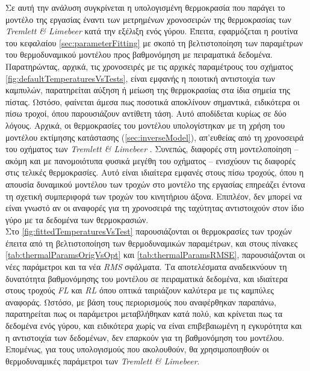Σε αυτή την ανάλυση συγκρίνεται η υπολογισμένη θερμοκρασία που παράγει το μοντέλο της εργασίας έναντι των μετρημένων χρονοσειρών της θερμοκρασίας των \textit{Tremlett \& Limebeer} \cite{Tremlett2016} κατά την εξέλιξη ενός γύρου. Έπειτα, εφαρμόζεται η ρουτίνα του κεφαλαίου \ref{sec:parameterFitting} με σκοπό τη βελτιστοποίηση των παραμέτρων του θερμοδυναμικού μοντέλου προς βαθμονόμηση με πειραματικά δεδομένα.\\[10pt]

Παρατηρώντας, αρχικά, τις χρονοσειρές με τις αρχικές παραμέτρους του σχήματος \ref{fig:defaultTemperaturesVsTests}, είναι εμφανής η ποιοτική αντιστοιχία των καμπυλών, παρατηρείται αύξηση ή μείωση της θερμοκρασίας στα ίδια σημεία της πίστας. Ωστόσο, φαίνεται άμεσα πως ποσοτικά αποκλίνουν σημαντικά, ειδικότερα οι πίσω τροχοί, όπου παρουσιάζουν αντίθετη τάση. Αυτό αποδίδεται κυρίως σε δύο λόγους. Αρχικά, οι θερμοκρασίες του μοντέλου υπολογίστηκαν με τη χρήση του μοντέλου εκτίμησης κατάστασης (\cref{sec:inverseModel}), απ'ευθείας από τη χρονοσειρά του οχήματος των \textit{Tremlett \& Limebeer} \cite{Tremlett2016}. Συνεπώς, διαφορές στη μοντελοποίηση -- ακόμη και με πανομοιότυπα φυσικά μεγέθη του οχήματος -- ενισχύουν τις διαφορές στις τελικές θερμοκρασίες. Αυτό είναι ιδιαίτερα εμφανές στους πίσω τροχούς, όπου η απουσία δυναμικού μοντέλου των τροχών στο μοντέλο της εργασίας επηρεάζει έντονα τη σχετική συμπεριφορά των τροχών του κινητήριου άξονα. Επιπλέον, δεν μπορεί να είναι γνωστό αν οι αναφορές για τη χρονοσειρά της ταχύτητας αντιστοιχούν στον ίδιο γύρο με τα δεδομένα των θερμοκρασιών.\\[10pt]

Στο \cref{fig:fittedTemperaturesVsTest} παρουσιάζονται οι θερμοκρασίες των τροχών έπειτα από τη βελτιστοποίηση των θερμοδυναμικών παραμέτρων, και στους πίνακες \ref{tab:thermalParamsOrigVsOpt} και \ref{tab:thermalParamsRMSE}, παρουσιάζονται οι νέες παράμετροι και τα νέα \textit{RMS} σφάλματα. Τα αποτελέσματα αναδεικνύουν τη δυνατότητα βαθμονόμησης του μοντέλου σε πειραματικά δεδομένα, και ιδιαίτερα στους τροχούς \textit{FL} και \textit{RL} όπου οπτικά ταιριάζουν καλύτερα με τις καμπύλες αναφοράς. Ωστόσο, με βάση τους περιορισμούς που αναφέρθηκαν παραπάνω, παρατηρείται πως οι παράμετροι μεταβλήθηκαν κατά πολύ, και κρίνεται πως τα δεδομένα ενός γύρου, και ειδικότερα χωρίς να είναι επιβεβαιωμένη η εγκυρότητα και η αντιστοιχία των δεδομένων, δεν επαρκούν για τη βαθμονόμηση του μοντέλου. Επομένως, για τους υπολογισμούς που ακολουθούν, θα χρησιμοποιηθούν οι θερμοδυναμικές παράμετροι των \textit{Tremlett \& Limebeer}.

